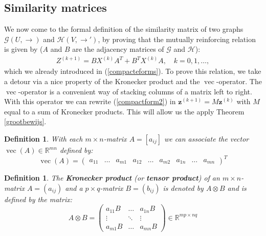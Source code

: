 \documentclass[a4paper,11pt]{report}
\newtheorem{definition}[theorem]{Definition}
\newcommand{\R}{{\mathbb R}}
\newcommand{\graf}{\mathscr{G}}
\newcommand{\grafeen}{\mathscr{H}}
\newcommand{\vect}{\operatorname{vec}}
\begin{document}
\subsection{Similarity matrices}
We now come to the formal definition of the similarity matrix of two graphs $\graf(U,\to)$ and $\grafeen(V, \to')$, by proving that the mutually reinforcing relation
is given by ($A$ and $B$ are the adjacency matrices of $\graf$ and $\grafeen$):
 \begin{eqnarray}\label{compactform2}
Z^{(k+1)} = BX^{(k)}A^T + B^TX^{(k)}A,\quad k=0,1,\ldots,
  \end{eqnarray}
which we already introduced in (\ref{compacteforms}). To prove this relation, we take a 
detour via a nice property of the Kronecker product and the $\vect$-operator. The $\vect$-operator
is a convenient way of stacking columns of a matrix left to right. With this operator 
we can rewrite (\ref{compactform2}) in $\mathbf{z}^{(k+1)} = M\mathbf{z}^{(k)}$ with $M$ equal to a sum of Kronecker products. This will 
allow us the apply Theorem \ref{grootbewijs}.
\begin{definition}\label{vectorization}
  With each $m\times n$-matrix $A = [a_{ij}]$ we can associate the vector $\vect(A) \in \R^{mn}$ 
  defined by:
  $$\vect(A) = \begin{pmatrix}
  a_{11} & \ldots & a_{m1} & a_{12} & \ldots & a_{m2} & a_{1n} & \ldots & a_{mn}
  \end{pmatrix}^T$$
\end{definition}

\begin{definition}
  The  \textbf{Kronecker product} (or \textbf{tensor product}) of an $m \times 
  n$-matrix $A = (a_{ij})$ and a $p \times q$-matrix $B = (b_{ij})$ is denoted 
  by $A \otimes B$ and is defined by the matrix:
  $$A \otimes B = \begin{pmatrix}
  a_{11}B & \ldots & a_{1n}B\\
  \vdots & \ddots & \vdots \\
  a_{m1}B & \ldots & a_{mn}B
  \end{pmatrix} \in \R^{mp \times nq}$$
\end{definition}
\end{document}
